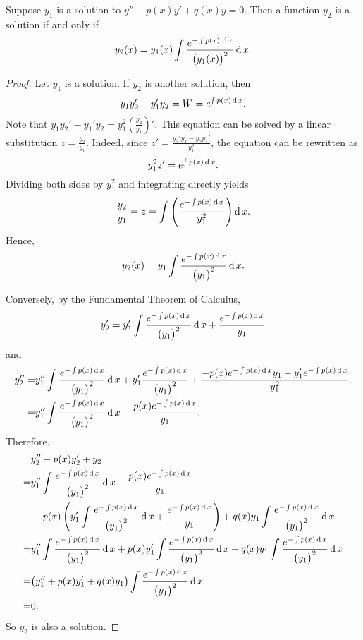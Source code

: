 \begin{proposition}\label{prop:WronskianNewSol}
Suppose $y_1$ is a solution to $y'' + p(x) y' + q(x) y = 0$. Then a function $y_2$ is a solution if and only if
\[
  y_2(x) = y_1(x) \int \frac{e^{-\int p(x)\,\operatorname{d} x}}{{\bigl(y_1(x)\bigr)}^2} \operatorname{d} x.
\]
\end{proposition}
\begin{proof}
Let $y_1$ is a solution. If $y_2$ is another solution, then
\[
y_1y_2'-y_1'y_2=W=e^{\int p(x)\operatorname{d} x}.
\]
Note that $y_1y_2'-y_1'y_2=y_1^2\left(\frac{y_2}{y_1}\right)'$. 
This equation can be solved by a linear substitution $z=\frac{y_2}{y_1}$.
Indeed, since $z'=\frac{y_2'y_1-y_2y_1'}{y_1^2}$, the equation can be rewritten as
\[y_1^2z'=e^{\int p(x)\operatorname{d} x}.\]
Dividing both sides by $y_1^2$ and integrating directly yields
\[\frac{y_2}{y_1}=z=\int\left(\dfrac{e^{-\int p(x)\operatorname{d} x}}{y_1^2}\right)\operatorname{d} x.\]
Hence,
\[y_2(x) = y_1\int \frac{e^{-\int p(x)\operatorname{d} x}}{{\bigl(y_1\bigr)}^2} \operatorname{d} x.\]

Conversely, by the Fundamental Theorem of Calculus,
\[y_2'=y_1' \int \frac{e^{-\int p(x)\operatorname{d} x}}{\bigl(y_1\bigr)^2} \operatorname{d} x + \frac{e^{-\int p(x)\operatorname{d} x}}{y_1}\]
and
\[
\begin{aligned}
y_2''=&y_1'' \int \frac{e^{-\int p(x)\operatorname{d} x}}{\bigl(y_1\bigr)^2} \operatorname{d} x + y_1' \frac{e^{-\int p(x)\operatorname{d} x}}{\bigl(y_1\bigr)^2} + \frac{-p(x)e^{-\int p(x)\operatorname{d} x}y_1-y_1'e^{-\int p(x)\operatorname{d} x}}{y_1^2}.\\
=&y_1'' \int \frac{e^{-\int p(x)\operatorname{d} x}}{\bigl(y_1\bigr)^2} \operatorname{d} x - \frac{p(x)e^{-\int p(x)\operatorname{d} x}}{y_1}.
\end{aligned}
\]
Therefore,
\[
\begin{aligned}
&y_2''+p(x)y_2'+y_2\\
=& y_1'' \int \frac{e^{-\int p(x)\operatorname{d} x}}{\bigl(y_1\bigr)^2} \operatorname{d} x - \frac{p(x)e^{-\int p(x)\operatorname{d} x}}{y_1}\\
&+p(x)\left(y_1' \int \frac{e^{-\int p(x)\operatorname{d} x}}{\bigl(y_1\bigr)^2} \operatorname{d} x +\frac{e^{-\int p(x)\operatorname{d} x}}{y_1}\right) + q(x)y_1 \int \frac{e^{-\int p(x)\operatorname{d} x}}{{\bigl(y_1\bigr)}^2} \operatorname{d} x\\
=& y_1'' \int \frac{e^{-\int p(x)\operatorname{d} x}}{\bigl(y_1\bigr)^2} \operatorname{d} x 
+ p(x) y_1' \int \frac{e^{-\int p(x)\operatorname{d} x}}{\bigl(y_1\bigr)^2} \operatorname{d} x
+q(x)y_1 \int \frac{e^{-\int p(x)\operatorname{d} x}}{{\bigl(y_1\bigr)}^2} \operatorname{d} x\\
=& \bigl(y_1'' + p(x) y_1' + q(x)y_1\bigr)\int \frac{e^{-\int p(x)\operatorname{d} x}}{{\bigl(y_1\bigr)}^2} \operatorname{d} x\\
=&0.
\end{aligned}
\]
So $y_2$ is also a solution.
\end{proof}

